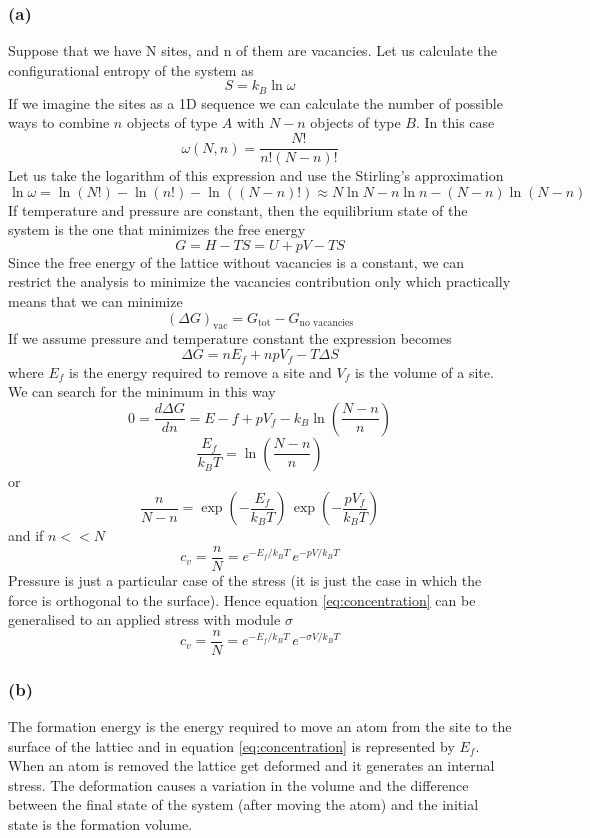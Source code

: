 \subsubsection*{(a)}
Suppose that we have N sites, and n of them are vacancies. Let us calculate the configurational entropy of the system as
$$S = k_B \ln\omega$$
If we imagine the sites as a 1D sequence we can calculate the number of possible ways to 
combine $n$ objects of type $A$ with $N-n$ objects of type $B$. In this case
$$\omega(N, n) = \frac{N!}{n!(N-n)!}$$
Let us take the logarithm of this expression and use the Stirling's approximation
$$\ln \omega = \ln(N!) - \ln(n!) - \ln((N-n)!) \approx N \ln N - n \ln n - (N-n)\ln(N-n)$$
If temperature and pressure are constant, then the equilibrium state of the system is the one that minimizes the free energy
$$G = H - TS = U + pV - TS$$
Since the free energy of the lattice without vacancies is a constant, we can restrict the analysis to minimize the vacancies contribution only which practically
means that we can minimize $$\left(\Delta G\right)_\text{vac} = G_\text{tot} - G_\text{no vacancies}$$
If we assume pressure and temperature constant the expression becomes
$$\Delta G = nE_f + npV_f- T\Delta S$$ 
where $E_f$ is the energy required to remove a site and $V_f$ is the volume of a site.
We can search for the minimum in this way 
$$ 0 = \frac{d \Delta G}{dn} = E-f + pV_f - k_B\ln\left(\frac{N-n}{n}\right)$$
$$\frac{E_f}{k_BT} = \ln\left(\frac{N-n}{n}\right)$$
or
$$\frac{n}{N-n} = \exp\left(-\frac{E_f}{k_B T}\right) \, \exp\left(-\frac{pV_f}{k_B T}\right)$$
and if $n << N$
\begin{equation}
    c_v = \frac{n}{N} = e^{-E_f/k_B T} \, e^{-p V/k_B T}
    \label{eq:concentration}
\end{equation}
Pressure is just a particular case of the stress (it is just the case in which the force is orthogonal to the surface). Hence equation \ref{eq:concentration} can 
be generalised to an applied stress with module $\sigma$
\begin{equation*}
    c_v = \frac{n}{N} = e^{-E_f/k_B T} \, e^{-\sigma V/k_B T}
\end{equation*}

\subsubsection*{(b)}
The formation energy is the energy required to move an atom from the site to the surface of the lattiec and in equation \ref{eq:concentration} is represented by $E_f$.
When an atom is removed the lattice get deformed and it generates an internal stress. The deformation causes a variation in the volume and the difference between the final state of the 
system (after moving the atom) and the initial state is the formation volume.